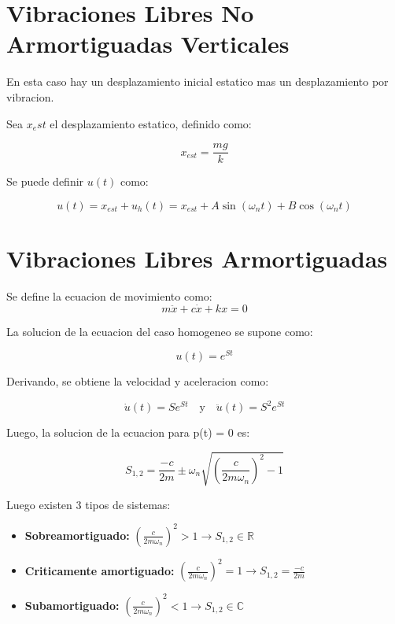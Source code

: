 \documentclass{article}  %
\begin{document}
\section{Vibraciones Libres No Armortiguadas Verticales}

En esta caso hay un desplazamiento inicial estatico mas un desplazamiento por vibracion.

Sea $x_est$ el desplazamiento estatico, definido como:

\begin{equation}
    x_{est} = \frac{mg}{k}
\end{equation}

Se puede definir $u(t)$ como:

\begin{equation}
    u(t) = x_{est} + u_h(t) = x_{est} + A \sin(\omega_n t) + B \cos(\omega_n t)
\end{equation}

\section{Vibraciones Libres Armortiguadas}

Se define la ecuacion de movimiento como:
\begin{equation}
    m \ddot{x} + c \dot{x} + kx = 0
\end{equation}

La solucion de la ecuacion del caso homogeneo se supone como:

\begin{equation}
    u(t) = e^{St}
\end{equation}

Derivando, se obtiene la velocidad y aceleracion como:

\begin{equation}
    \dot{u}(t) = Se^{St} \quad \text{y} \quad \ddot{u}(t) = S^2 e^{St}
\end{equation}

Luego, la solucion de la ecuacion para p(t) = 0 es:

\begin{equation}
    S_{1,2} =  \frac{-c}{2m} \pm \omega_n \sqrt{(\frac{c}{2m\omega_n})^2 - 1}
\end{equation}

Luego existen 3 tipos de sistemas:
\begin{itemize}
    \item \textbf{Sobreamortiguado:} $(\frac{c}{2m\omega_n})^2 > 1 \rightarrow S_{1,2} \in \mathbb{R}$ 
    \item \textbf{Criticamente amortiguado:} $(\frac{c}{2m\omega_n})^2 = 1  \rightarrow S_{1,2} = \frac{-c}{2m}$
    \item \textbf{Subamortiguado:} $(\frac{c}{2m\omega_n})^2 < 1 \rightarrow S_{1,2} \in \mathbb{C}$
\end{itemize}
\end{document}

